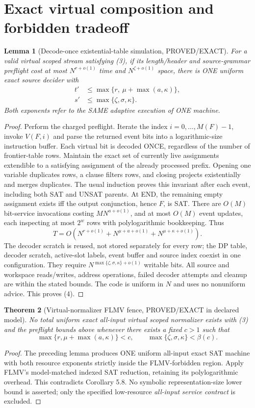 \documentclass[11pt]{article}
\newtheorem{theorem}{Theorem}
\newtheorem{lemma}[theorem]{Lemma}
\begin{document}
\section{Exact virtual composition and forbidden tradeoff}
\begin{lemma}[Decode-once existential-table simulation, PROVED/EXACT]
For a valid virtual scoped stream satisfying (3), if its length/header and source-grammar preflight cost at most $N^{r+o(1)}$ time and $N^{\zeta+o(1)}$ space, there is ONE uniform exact source decider with
\[
\boxed{\begin{aligned}
t'&\le\max\{r,\ \mu+\max(a,\kappa)\},\\
s'&\le\max\{\zeta,\sigma,\kappa\}.
\end{aligned}}\tag{4}
\]
Both exponents refer to the SAME adaptive execution of ONE machine.
\end{lemma}
\begin{proof}
Perform the charged preflight. Iterate the index $i=0,\ldots,M(F)-1$, invoke $V(F,i)$ and parse the returned event bits into a logarithmic-size instruction buffer. Each virtual bit is decoded ONCE, regardless of the number of frontier-table rows. Maintain the exact set of currently live assignments extendible to a satisfying assignment of the already processed prefix. Opening one variable duplicates rows, a clause filters rows, and closing projects existentially and merges duplicates. The usual induction proves this invariant after each event, including both SAT and UNSAT parents. At END, the remaining empty assignment exists iff the output conjunction, hence $F$, is SAT.
There are $O(M)$ bit-service invocations costing $M N^{a+o(1)}$, and at most $O(M)$ event updates, each inspecting at most $2^w$ rows with polylogarithmic bookkeeping. Thus
\[
T=O\!\left(N^{r+o(1)}+N^{\mu+a+o(1)}
       +N^{\mu+\kappa+o(1)}\right).
\]
The decoder scratch is reused, not stored separately for every row; the DP table, decoder scratch, active-slot labels, event buffer and source index coexist in one configuration. They require $N^{\max\{\zeta,\sigma,\kappa\}+o(1)}$ writable bits. All source and workspace reads/writes, address operations, failed decoder attempts and cleanup are within the stated bounds. The code is uniform in $N$ and uses no nonuniform advice. This proves (4).
\end{proof}

\begin{theorem}[Virtual-normalizer FLMV fence, PROVED/EXACT in declared model]
No total uniform exact all-input virtual scoped normalizer exists with (3) and the preflight bounds above whenever there exists a fixed $c>1$ such that
\[
\boxed{
\max\{r,\mu+\max(a,\kappa)\}<c,\qquad
\max\{\zeta,\sigma,\kappa\}<\beta(c).
}\tag{5}
\]
\end{theorem}
\begin{proof}
The preceding lemma produces ONE uniform all-input exact SAT machine with both resource exponents strictly inside the FLMV-forbidden region. Apply FLMV's model-matched indexed SAT reduction, retaining its polylogarithmic overhead. This contradicts Corollary 5.8. No symbolic representation-size lower bound is asserted; only the specified low-resource \emph{all-input service contract} is excluded.
\end{proof}
\end{document}

